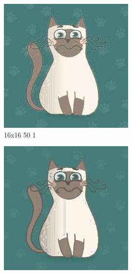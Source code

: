 \documentclass[12pt,a4paper]{article}
\begin{document}
\begin{figure}[H]
\medskip
\begin{subfigure}{0.25\textwidth}
  \includegraphics[width=\linewidth]{images/cartoon/16-16-50-1}
  \caption{16x16 50 1}
  \label{fig:10}
\end{subfigure}\hfil %
\begin{subfigure}{0.25\textwidth}
  \includegraphics[width=\linewidth]{images/cartoon/16-16-100-05}

\end{subfigure}
\end{figure}
\end{document}
